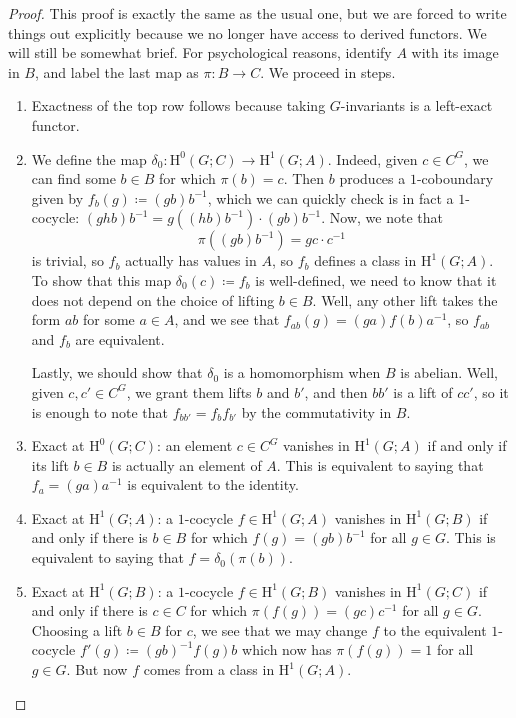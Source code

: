 \documentclass[notes.tex]{subfiles}
\begin{document}
\begin{proof}
	This proof is exactly the same as the usual one, but we are forced to write things out explicitly because we no longer have access to derived functors. We will still be somewhat brief. For psychological reasons, identify $A$ with its image in $B$, and label the last map as $\pi\colon B\to C$. We proceed in steps.
	\begin{enumerate}
		\item Exactness of the top row follows because taking $G$-invariants is a left-exact functor.

		\item We define the map $\delta_0\colon\mathrm H^0(G;C)\to\mathrm H^1(G;A)$. Indeed, given $c\in C^G$, we can find some $b\in B$ for which $\pi(b)=c$. Then $b$ produces a $1$-coboundary given by $f_b(g)\coloneqq (gb)b^{-1}$, which we can quickly check is in fact a $1$-cocycle: $(ghb)b^{-1}=g\left((hb)b^{-1}\right)\cdot (gb)b^{-1}$. Now, we note that
		\[\pi\left((gb)b^{-1}\right)=gc\cdot c^{-1}\]
		is trivial, so $f_b$ actually has values in $A$, so $f_b$ defines a class in $\mathrm H^1(G;A)$. To show that this map $\delta_0(c)\coloneqq f_b$ is well-defined, we need to know that it does not depend on the choice of lifting $b\in B$. Well, any other lift takes the form $ab$ for some $a\in A$, and we see that $f_{ab}(g)=(ga)f(b)a^{-1}$, so $f_{ab}$ and $f_b$ are equivalent.

		Lastly, we should show that $\delta_0$ is a homomorphism when $B$ is abelian. Well, given $c,c'\in C^G$, we grant them lifts $b$ and $b'$, and then $bb'$ is a lift of $cc'$, so it is enough to note that $f_{bb'}=f_bf_{b'}$ by the commutativity in $B$.

		\item Exact at $\mathrm H^0(G;C)$: an element $c\in C^G$ vanishes in $\mathrm H^1(G;A)$ if and only if its lift $b\in B$ is actually an element of $A$. This is equivalent to saying that $f_a=(ga)a^{-1}$ is equivalent to the identity.

		\item Exact at $\mathrm H^1(G;A)$: a $1$-cocycle $f\in\mathrm H^1(G;A)$ vanishes in $\mathrm H^1(G;B)$ if and only if there is $b\in B$ for which $f(g)=(gb)b^{-1}$ for all $g\in G$. This is equivalent to saying that $f=\delta_0(\pi(b))$.

		\item Exact at $\mathrm H^1(G;B)$: a $1$-cocycle $f\in\mathrm H^1(G;B)$ vanishes in $\mathrm H^1(G;C)$ if and only if there is $c\in C$ for which $\pi(f(g))=(gc)c^{-1}$ for all $g\in G$. Choosing a lift $b\in B$ for $c$, we see that we may change $f$ to the equivalent $1$-cocycle $f'(g)\coloneqq(gb)^{-1}f(g)b$ which now has $\pi(f(g))=1$ for all $g\in G$. But now $f$ comes from a class in $\mathrm H^1(G;A)$.
		\qedhere
	\end{enumerate}
\end{proof}
\end{document}
